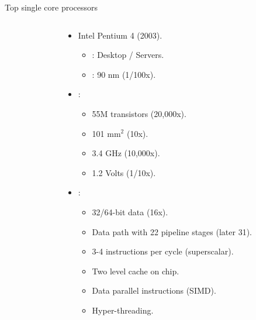 \begin{frame}[t,shrink=15]{Top single core processors}
\begin{columns}
\begin{column}{.15\textwidth}
\begin{center}
    \end{center}
  \end{column}
  \begin{column}{.7\textwidth}
    \begin{itemize}
      \item Intel Pentium 4 (2003).
        \begin{itemize}
          \item {}: Desktop / Servers.
          \item {}: 90 nm (1/100x).
        \end{itemize}
      \item {}:
        \begin{itemize}
          \item 55M transistors (20,000x).
          \item 101 mm$^2$ (10x).
          \item 3.4 GHz (10,000x).
          \item 1.2 Volts (1/10x).
        \end{itemize}
      \item {}:
        \begin{itemize}
          \item 32/64-bit data (16x).
          \item Data path with 22 pipeline stages (later 31).
          \item 3-4 instructions per cycle (superscalar).
          \item Two level cache on chip.
          \item Data parallel instructions (SIMD).
          \item Hyper-threading.
        \end{itemize}
    \end{itemize}
  \end{column}
\end{columns}
\end{frame}

